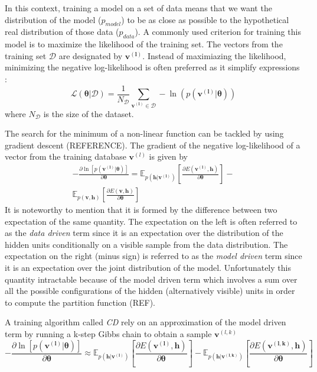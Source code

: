 \documentclass[letterpaper]{article}
\begin{document}
In this context, training a model on a set of data means that we want the distribution of the model ($p_{model}$) to be as close as possible to the hypothetical real distribution of those data ($p_{data}$). A commonly used criterion for training this model is to maximize the likelihood of the training set. The vectors from the training set $\mathcal{D}$ are designated by $\bm{v^{(l)}}$.
Instead of maximiazing the likelihood, minimizing the negative log-likelihood is often preferred as it simplify expressions :
\begin{equation}
\mathcal{L(\bm{\theta}|\mathcal{D})}  = \frac{1}{N_{\mathcal{D}}} \sum_{\bm{v^{(l)}} \in \mathcal{D}} - \ln \left( p(\bm{v^{(l)}}|\bm{\theta})\right)
\end{equation}
where $N_{\mathcal{D}}$ is the size of the dataset. 

The search for the minimum of a non-linear function can be tackled by using gradient descent (REFERENCE). The gradient of the negative log-likelihood of a vector from the training database $\bm{v}^{(l)}$ is given by
\begin{equation}
\begin{split}
- \frac{\partial \ln \left[ p(\bm{v^{(l)}}|\bm{\theta})\right]}{\partial \bm{\theta}} 
= 
\mathbb{E}_{p(\bm{h}|\bm{v^{(l)}})} \left[ \frac{\partial E(\bm{v^{(l)}},\bm{h})}{\partial \bm{\theta}} \right] 
- \\
\mathbb{E}_{p(\bm{v} , \bm{h})} \left[ \frac{\partial E(\bm{v},\bm{h})}{\partial \bm{\theta}} \right]
\end{split}
\end{equation}
It is noteworthy to mention that it is formed by the difference between two expectation of the same quantity. The expectation on the left is often referred to as the \textit{data driven} term since it is an expectation over the distribution of the hidden units conditionally on a visible sample from the data distribution. 
The expectation on the right (minus sign) is referred to as the \textit{model driven} term since it is an expectation over the joint distribution of the model.
Unfortunately this quantity intractable because of the model driven term which involves a sum over all the possible configurations of the hidden (alternatively visible) units in order to compute the partition function (REF).

A training algorithm called \textit{CD} \cite{hinton2002training} rely on an approximation of the model driven term by running a k-step Gibbs chain to obtain a sample $\bm{v}^{(l,k)}$
\begin{equation}
\label{eq:grad_log_like}
- \frac{\partial \ln \left[ p(\bm{v^{(l)}}|\bm{\theta})\right]}{\partial \bm{\theta}}
\approx 
\mathbb{E}_{p(\bm{h}|\bm{v^{(l)}})} \left[ \frac{\partial E(\bm{v^{(l)}},\bm{h})}{\partial \bm{\theta}} \right] 
- 
\mathbb{E}_{p(\bm{h} | \bm{v^{(l,k)}})} \left[ \frac{\partial E(\bm{v^{(l,k)}},\bm{h})}{\partial \bm{\theta}} \right]
\end{equation}
\end{document}
